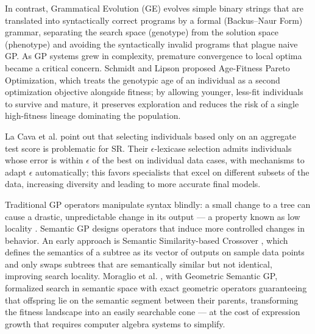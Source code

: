 In contrast, Grammatical Evolution (GE) \cite{oneill_grammatical_2003} evolves simple binary strings that are translated into syntactically correct programs by a formal (Backus--Naur Form) grammar, separating the search space (genotype) from the solution space (phenotype) and avoiding the syntactically invalid programs that plague naive GP. As GP systems grew in complexity, premature convergence to local optima became a critical concern. Schmidt and Lipson \cite{schmidt2011age} proposed Age-Fitness Pareto Optimization, which treats the genotypic age of an individual as a second optimization objective alongside fitness; by allowing younger, less-fit individuals to survive and mature, it preserves exploration and reduces the risk of a single high-fitness lineage dominating the population.

La Cava et al. \cite{cava_epsilon-lexicase_2016} point out that selecting individuals based only on an aggregate test score is problematic for SR. Their $\epsilon$-lexicase selection admits individuals whose error is within $\epsilon$ of the best on individual data cases, with mechanisms to adapt $\epsilon$ automatically; this favors specialists that excel on different subsets of the data, increasing diversity and leading to more accurate final models.

Traditional GP operators manipulate syntax blindly: a small change to a tree can cause a drastic, unpredictable change in its output --- a property known as low locality \cite{uy_semantically-based_2011}. Semantic GP designs operators that induce more controlled changes in behavior. An early approach is Semantic Similarity-based Crossover \cite{uy_semantically-based_2011}, which defines the semantics of a subtree as its vector of outputs on sample data points and only swaps subtrees that are semantically similar but not identical, improving search locality. Moraglio et al. \cite{moraglio2012gsgp}, with Geometric Semantic GP, formalized search in semantic space with exact geometric operators guaranteeing that offspring lie on the semantic segment between their parents, transforming the fitness landscape into an easily searchable cone --- at the cost of expression growth that requires computer algebra systems to simplify.

